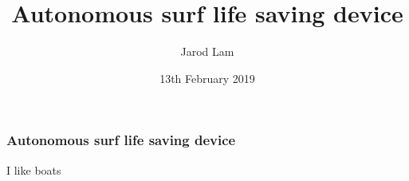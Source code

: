 \documentclass{beamer}
\title{Autonomous surf life saving device}
\author{Jarod Lam}
\institute[QUT]{Queensland University of Technology}
\date{13th February 2019}
\begin{document}
\begin{frame}
\frametitle{Autonomous surf life saving device}

I like boats

\end{frame}
\end{document}
